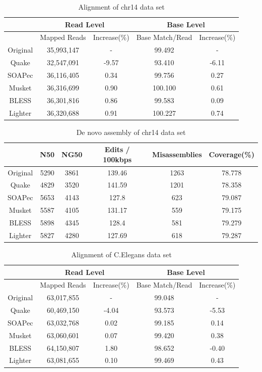 \documentclass{bmcart}
\begin{document}
\begin{backmatter}
\begin{table}[h!]%
\caption{Alignment of chr14 data set}
\begin{tabular}{|c|c|c||c|c|}\hline
  & \multicolumn{2}{|c||}{Read Level} & \multicolumn{2}{|c|}{Base Level} \\ \hline
  & Mapped Reads  &Increase(\%) & Base Match/Read	& Increase(\%) \\ \hline
Original & 35,993,147	&- 		&	99.492	& - \\ \hline
Quake 	& 32,547,091	& -9.57 &	93.410	& -6.11 \\ \hline
SOAPec  & 36,116,405  & 0.34 & 99.756 & 0.27 \\ \hline
Musket 	&	36,316,699	& 0.90	& 100.100	& 0.61 \\ \hline
BLESS 	&36,301,816	& 0.86	& 99.583	&	0.09 \\ \hline
Lighter	& 36,320,688 & 0.91	& 100.227	&  0.74 \\ \hline
\end{tabular}
\end{table}

\begin{table}[h!] %
\caption{De novo assembly of chr14 data set}
\begin{tabular}{|c|c|c|c|c|c|} \hline
	   & N50 &	NG50	& Edits / 100kbps &	Misassemblies	& Coverage(\%) \\ \hline
Original &	5290 & 3861	& 139.46 &1263	& 78.778 \\ \hline
Quake	&	4829 & 3520 & 141.59 & 1201 &	78.358 \\ \hline
SOAPec & 5653	& 4143	& 127.8 &	623	 & 79.087 \\ \hline
Musket	&	5587& 	4105 &	131.17	& 559 &	79.175  \\ \hline
BLESS	&	5898 &	4345 &	128.4	& 581 &	79.279 \\ \hline
Lighter	&	5827 & 4280	& 127.69	& 618 & 79.287 \\ \hline
\end{tabular}
\end{table}

\begin{table}[h!]%
\caption{Alignment of C.Elegans data set}
\begin{tabular}{|c|c|c||c|c|}\hline
  & \multicolumn{2}{|c||}{Read Level} & \multicolumn{2}{|c|}{Base Level} \\ \hline
  & Mapped Reads  &Increase(\%) & Base Match/Read	& Increase(\%) \\ \hline
Original & 63,017,855	& - 	&	99.048	& - \\ \hline
Quake 	& 60,469,150	& -4.04	&	93.573	& -5.53 \\ \hline
SOAPec  & 63,032,768    & 0.02	& 	99.185	&	0.14 \\ \hline
Musket 	&	63,060,601	&	0.07 &	99.420 & 0.38 \\ \hline
BLESS 	& 64,150,807	& 1.80 &98.652	& -0.40 \\ \hline
Lighter	& 63,081,655	& 0.10	& 99.469 &0.43 \\ \hline
\end{tabular}
\end{table}


\end{backmatter}
\end{document}

